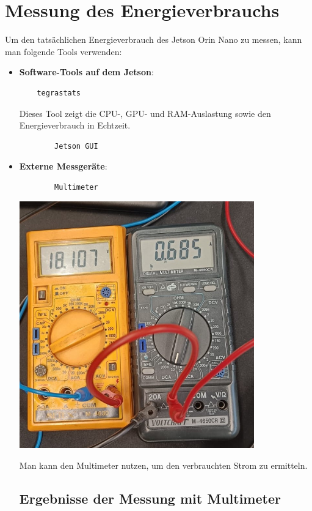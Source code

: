 \documentclass[12pt]{article}
\begin{document}
\section{Messung des Energieverbrauchs}
Um den tatsächlichen Energieverbrauch des Jetson Orin Nano zu messen, kann man folgende 
Tools verwenden:
\begin{itemize}
    \item \textbf{Software-Tools auf dem Jetson}:
    \begin{verbatim}
    tegrastats
    \end{verbatim}
    Dieses Tool zeigt die CPU-, GPU- und RAM-Auslastung sowie den Energieverbrauch in 
    Echtzeit.

    \begin{verbatim}
        Jetson GUI
    \end{verbatim}

    \item \textbf{Externe Messgeräte}: 
    \begin{verbatim}
        Multimeter
\end{verbatim}

\includegraphics[width=0.8\textwidth]{Bilder/Multimeter_Messung.jpeg}

Man kann den Multimeter nutzen, um den verbrauchten Strom zu ermitteln.

\subsection*{Ergebnisse der Messung mit Multimeter}


\end{itemize}
\end{document}
